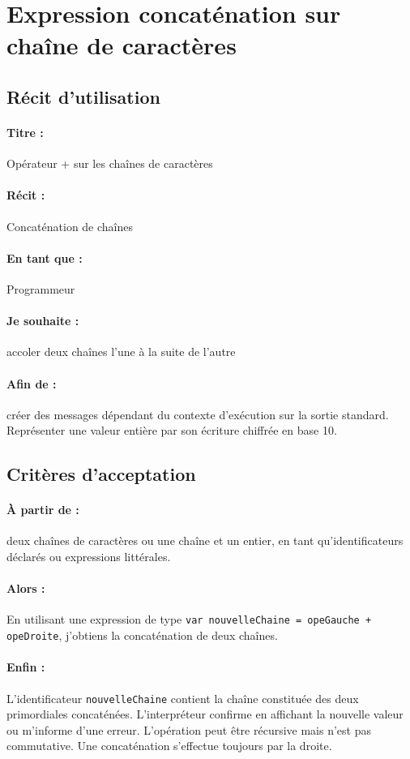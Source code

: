     \section{Expression concaténation sur chaîne de caractères}

    \subsection*{Récit d'utilisation}

    \paragraph{Titre : } Opérateur + sur les chaînes de caractères
    \paragraph{Récit : } Concaténation de chaînes
    \paragraph{En tant que : } Programmeur
    \paragraph{Je souhaite : } accoler deux chaînes l'une à la suite de l'autre
    \paragraph{Afin de : } créer des messages dépendant du contexte d'exécution sur
    la sortie standard. Représenter une valeur entière par son écriture chiffrée en
    base 10.


    \subsection*{Critères d'acceptation}

    \paragraph{À partir de : } deux chaînes de caractères ou une chaîne et un entier,
    en tant qu'identificateurs déclarés ou expressions littérales.

    \paragraph{Alors : } En utilisant une expression de type
    \verb|var nouvelleChaine = opeGauche + opeDroite|, j'obtiens la concaténation de
    deux chaînes.

    \paragraph{Enfin : } L'identificateur \verb|nouvelleChaine| contient la chaîne
    constituée des deux primordiales concaténées. L'interpréteur confirme en affichant
    la nouvelle valeur ou m'informe d'une erreur. L'opération peut être récursive mais n'est pas commutative. Une concaténation s'effectue toujours par la droite.